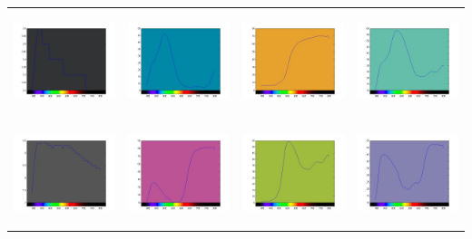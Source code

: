\documentclass{amsart}
\theoremstyle{definition}
\theoremstyle{remark}
\numberwithin{equation}{section}
\begin{document}
\begin{tabular}{  c c c c }
\includegraphics[width=3.0cm,height=3.0cm]{ch1.jpg}
&
\includegraphics[width=3.0cm,height=3.0cm]{ch2.jpg}
&
\includegraphics[width=3.0cm,height=3.0cm]{ch3.jpg}
&
\includegraphics[width=3.0cm,height=3.0cm]{ch4.jpg}
\\

\includegraphics[width=3.0cm,height=3.0cm]{ch5.jpg}
&
\includegraphics[width=3.0cm,height=3.0cm]{ch6.jpg}
&
\includegraphics[width=3.0cm,height=3.0cm]{ch7.jpg}
&
\includegraphics[width=3.0cm,height=3.0cm]{ch8.jpg}
\\


\end{tabular}
\end{document}
